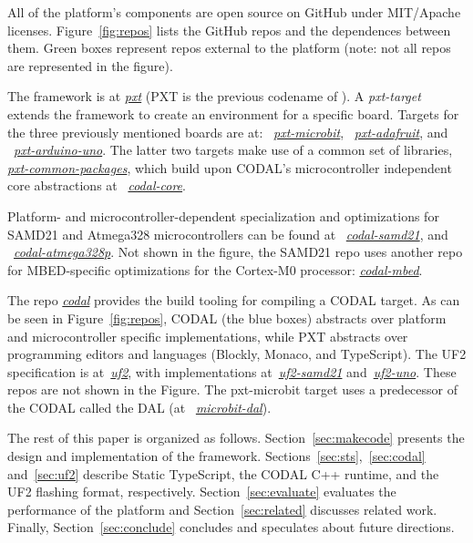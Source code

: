 All of the platform's components are open source on GitHub
under MIT/Apache licenses. 
Figure~\ref{fig:repos} lists the GitHub repos and the dependences between them. Green boxes represent repos external to the platform (note: not all
repos are represented in the figure).

The \MC framework 
is at \emph{\href{https://github.com/microsoft/pxt}{pxt}} (PXT is the previous codename of \MC). 
A \emph{pxt-target} extends the framework to create an environment for a specific board. Targets
for the three previously mentioned boards are at: 
~\emph{\href{https://github.com/microsoft/pxt-microbit}{pxt-microbit}}, 
~\emph{\href{https://github.com/microsoft/pxt-adafruit}{pxt-adafruit}}, and
~\emph{\href{https://github.com/microsoft/pxt-arduino-uno}{pxt-arduino-uno}}.
The latter two targets make use of a common set of libraries, 
\emph{\href{https://github.com/microsoft/pxt-common-packages}{pxt-common-packages}},
which build upon CODAL's microcontroller independent core abstractions at
~\emph{\href{https://github.com/lancaster-university/codal-core}{codal-core}}.  

Platform- and microcontroller-dependent specialization and optimizations for 
SAMD21 and Atmega328 microcontrollers can be found at
~\emph{\href{https://github.com/lancaster-university/codal-samd21}{codal-samd21}}, 
and
~\emph{\href{https://github.com/lancaster-university/codal-atmega328p}{codal-atmega328p}}.
Not shown in the figure, the SAMD21 repo uses another repo for
MBED-specific optimizations for the Cortex-M0 processor: \emph{\href{https://github.com/lancaster-university/codal-mbed}{codal-mbed}}.

The repo \emph{\href{https://github.com/lancaster-university/codal}{codal}} provides the
build tooling for compiling a CODAL target.  As can be seen in Figure~\ref{fig:repos}, 
CODAL (the blue boxes) abstracts over platform and microcontroller specific
implementations, while PXT abstracts over programming editors
and languages (Blockly, Monaco, and TypeScript).
The UF2 specification is at~\emph{\href{https://github.com/microsoft/uf2}{uf2}},
with implementations at~\emph{\href{https://github.com/microsoft/uf2-samd21}{uf2-samd21}}
and~\emph{\href{https://github.com/mmoskal/uf2-uno}{uf2-uno}}. These repos are not
shown in the Figure. 
The pxt-microbit target uses a predecessor of the CODAL called the DAL (at
~\emph{\href{https://github.com/lancaster-university/microbit-dal}{microbit-dal}}).

The rest of this paper is organized as follows. Section~\ref{sec:makecode} presents the design and implementation of the \MC framework. 
Sections~\ref{sec:sts},~\ref{sec:codal} and~\ref{sec:uf2} describe Static TypeScript, the CODAL C++ runtime, and the UF2 flashing format,
respectively.  Section~\ref{sec:evaluate} evaluates the performance of the platform and
Section~\ref{sec:related} discusses related work. Finally, Section~\ref{sec:conclude} concludes and speculates about future directions. 
